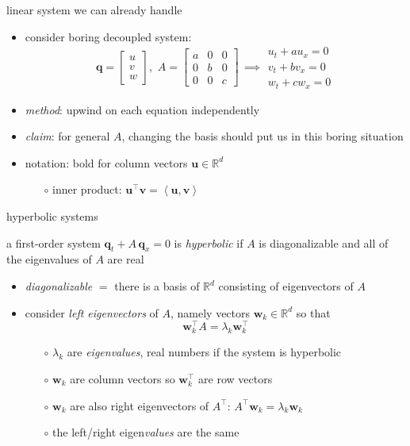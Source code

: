 \documentclass[10pt,dvipsnames,usepdftitle=false,
hyperref={pdftitle = {Finite volume methods},
    pdfauthor = {Ed Bueler}}]{beamer}
\newcommand{\bq}{\mathbf{q}}
\newcommand{\bv}{\mathbf{v}}
\newcommand{\bu}{\mathbf{u}}
\newcommand{\bw}{\mathbf{w}}
\newcommand{\RR}{\mathbb{R}}
\newcommand{\ip}[2]{\left<#1,#2\right>}
\begin{document}
\begin{frame}{linear system we can already handle}

\begin{itemize}
\item consider boring decoupled system:
        $$\bq = \begin{bmatrix} u \\ v \\ w \end{bmatrix}, \,\, A = \begin{bmatrix} a & 0 & 0 \\ 0 & b & 0 \\ 0 & 0 & c \end{bmatrix} \, \implies \begin{matrix} u_t + a u_x = 0 \\ v_t + b v_x = 0 \\ w_t + c w_x = 0 \end{matrix}$$
\item \emph{method}: upwind on each equation independently

\bigskip
\item \emph{claim}: for general $A$, changing the basis should put us in this boring situation
\item notation: bold for column vectors $\bu\in\RR^d$
    \begin{itemize}
    \item[$\circ$] inner product: \quad $\bu^\top \bv = \ip{\bu}{\bv}$
    \end{itemize}
\end{itemize}
\end{frame}


\begin{frame}{hyperbolic systems}

\begin{definition} a first-order system $\bq_t + A\, \bq_x=0$ is \emph{hyperbolic} if $A$ is diagonalizable and all of the eigenvalues of $A$ are real
\end{definition}

\begin{itemize}
\item \emph{diagonalizable} $=$ there is a basis of $\RR^d$ consisting of eigenvectors of $A$
\item consider \emph{left eigenvectors} of $A$, namely vectors $\bw_k \in \RR^d$ so that
    $$\bw_k^\top A = \lambda_k \bw_k^\top$$

\vspace{-2mm}
    \begin{itemize}
    \item[$\circ$] $\lambda_k$ are \emph{eigenvalues}, real numbers if the system is hyperbolic
    \item[$\circ$] $\bw_k$ are column vectors so $\bw_k^\top$ are row vectors
    \item[$\circ$] $\bw_k$ are also right eigenvectors of $A^\top$: \qquad $A^\top \bw_k = \lambda_k \bw_k$
    \item[$\circ$] the left/right eigen\emph{values} are the same
    \end{itemize}
\end{itemize}
\end{frame}
\end{document}
